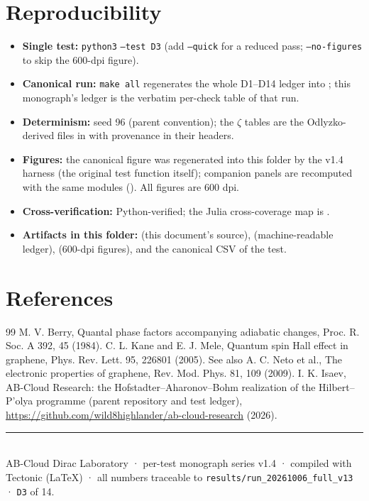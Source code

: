 \documentclass[11pt,a4paper]{article}
\begin{document}
\section{Reproducibility}
\begin{itemize}[leftmargin=1.2em, itemsep=0.15em]
\item \textbf{Single test:} \texttt{python3}  \texttt{--test D3} (add \texttt{--quick} for a reduced pass; \texttt{--no-figures} to skip the 600-dpi figure).
\item \textbf{Canonical run:} \texttt{make all} regenerates the whole D1--D14 ledger into ; this monograph's ledger is the verbatim per-check table of that run.
\item \textbf{Determinism:} seed 96 (parent convention); the $\zeta$ tables are the Odlyzko-derived files in  with provenance in their headers.
\item \textbf{Figures:} the canonical figure was regenerated into this folder by the v1.4 harness (the original test function itself); companion panels are recomputed with the same modules (). All figures are 600 dpi.
\item \textbf{Cross-verification:} Python-verified; the Julia cross-coverage map is .
\item \textbf{Artifacts in this folder:}  (this document's source),  (machine-readable ledger),  (600-dpi figures), and the canonical CSV of the test.
\end{itemize}

\section*{References}
\begin{thebibliography}{99}\small
{} M. V. Berry, Quantal phase factors accompanying adiabatic changes, Proc. R. Soc. A 392, 45 (1984).
 C. L. Kane and E. J. Mele, Quantum spin Hall effect in graphene, Phys. Rev. Lett. 95, 226801 (2005). See also A. C. Neto et al., The electronic properties of graphene, Rev. Mod. Phys. 81, 109 (2009).
 I. K. Isaev, AB-Cloud Research: the Hofstadter--Aharonov--Bohm realization of the Hilbert--P'olya programme (parent repository and test ledger), \url{https://github.com/wild8highlander/ab-cloud-research} (2026).
\end{thebibliography}

\vfill
\noindent\rule{\textwidth}{0.4pt}\\[0.2em]
{\footnotesize\color{labgray} AB-Cloud Dirac Laboratory · per-test monograph series v1.4 · compiled with Tectonic (LaTeX) · all numbers traceable to \texttt{results/run\_20261006\_full\_v13} · \texttt{D3} of 14.}
\end{document}
